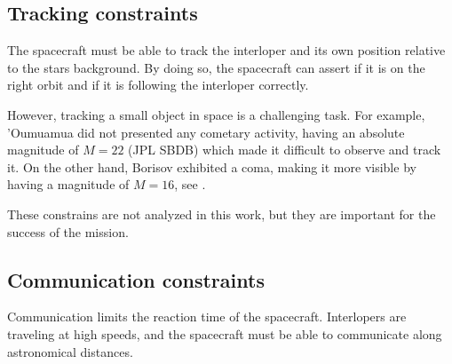 \subsection{Tracking constraints}

The spacecraft must be able to track the interloper and its own position
relative to the stars background. By doing so, the spacecraft can assert if it
is on the right orbit and if it is following the interloper correctly.

However, tracking a small object in space is a challenging task. For example,
'Oumuamua did not presented any cometary activity, having an absolute magnitude
of $M = 22$ (JPL SBDB) which made it difficult to
observe and track it. On the other hand, Borisov exhibited a coma, making it
more visible by having a magnitude of $M = 16$, see \cite{jewitt2020}.

These constrains are not analyzed in this work, but they are important for the
success of the mission.

\subsection{Communication constraints}

Communication limits the reaction time of the spacecraft. Interlopers are
traveling at high speeds, and the spacecraft must be able to communicate along
astronomical distances.
